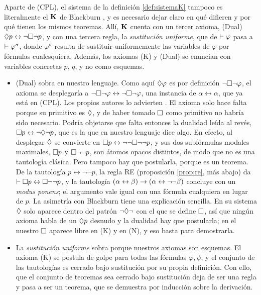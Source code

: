 \begin{observacion}
Aparte de (CPL), el sistema de la definición \ref{def:sistemaK} tampoco es literalmente el $\mathbf{K}$ de Blackburn \cite[Def.~1.39]{blackburn}, y es necesario dejar claro en qué difieren y por qué tienen los mismos teoremas. Allí, $\mathbf{K}$ cuenta con un tercer axioma, \textup{(Dual)} $\lozenge p \leftrightarrow \lnot\square\lnot p$, y con una tercera regla, la \emph{sustitución uniforme}, que de $\vdash \varphi$ pasa a $\vdash \varphi^\sigma$, donde $\varphi^\sigma$ resulta de sustituir uniformemente las variables de $\varphi$ por fórmulas cualesquiera. Además, los axiomas (K) y (Dual) se enuncian con variables concretas $p$, $q$, y no como esquemas.
\begin{itemize}
  \item \textup{(Dual)} sobra en nuestro lenguaje. Como aquí $\lozenge\varphi$ es por definición $\lnot\square\lnot\varphi$, el axioma se desplegaría a $\lnot\square\lnot\varphi \leftrightarrow \lnot\square\lnot\varphi$, una instancia de $\alpha \leftrightarrow \alpha$, que ya está en (CPL). Los propios autores lo advierten \cite[p.~34]{blackburn}. El axioma solo hace falta porque su primitivo es $\lozenge$, y de haber tomado $\square$ como primitivo no habría sido necesario. Podría objetarse que falta entonces la dualidad leída al revés, $\square p \leftrightarrow \lnot\lozenge\lnot p$, que es la que en nuestro lenguaje dice algo. En efecto, al desplegar $\lozenge$ se convierte en $\square p \leftrightarrow \lnot\lnot\square\lnot\lnot p$, y sus dos subfórmulas modales maximales, $\square p$ y $\square\lnot\lnot p$, son átomos opacos distintos, de modo que no es una tautología clásica. Pero tampoco hay que postularla, porque es un teorema. De la tautología $p \leftrightarrow \lnot\lnot p$, la regla RE (proposición \ref{prop:re}, más abajo) da $\vdash \square p \leftrightarrow \square\lnot\lnot p$, y la tautología $(\alpha \leftrightarrow \beta) \to (\alpha \leftrightarrow \lnot\lnot\beta)$ concluye con un \emph{modus ponens}; el argumento vale igual con una fórmula cualquiera en lugar de $p$. La asimetría con Blackburn tiene una explicación sencilla. En su sistema $\lozenge$ solo aparece dentro del patrón $\lnot\lozenge\lnot$ con el que se define $\square$, así que ningún axioma habla de un $\lozenge p$ desnudo y la dualidad hay que postularla; en el nuestro $\square$ aparece libre en (K) y en (N), y eso basta para demostrarla.
  \item La \emph{sustitución uniforme} sobra porque nuestros axiomas son esquemas. El axioma (K) se postula de golpe para todas las fórmulas $\varphi, \psi$, y el conjunto de las tautologías es cerrado bajo sustitución por su propia definición. Con ello, que el conjunto de teoremas sea cerrado bajo sustitución deja de ser una regla y pasa a ser un teorema, que se demuestra por inducción sobre la derivación.
\end{itemize}
\end{observacion}

